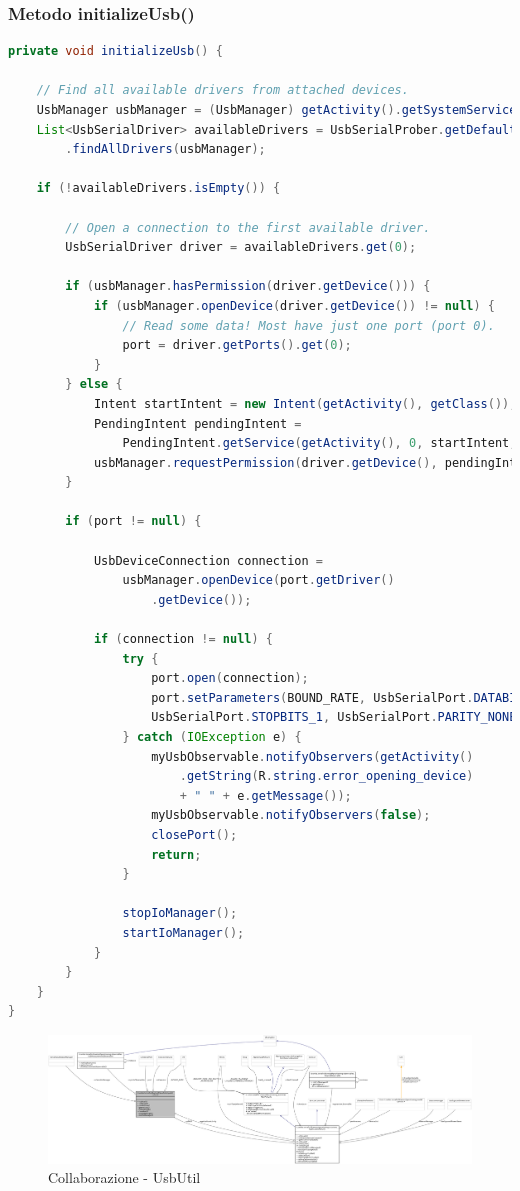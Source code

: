 \subsubsection{Metodo initializeUsb()}
\begin{lstlisting}[language=Java]
private void initializeUsb() {
	
	// Find all available drivers from attached devices.
	UsbManager usbManager = (UsbManager) getActivity().getSystemService(Context.USB_SERVICE);
	List<UsbSerialDriver> availableDrivers = UsbSerialProber.getDefaultProber()
		.findAllDrivers(usbManager);
		
	if (!availableDrivers.isEmpty()) {
		
		// Open a connection to the first available driver.
		UsbSerialDriver driver = availableDrivers.get(0);
		
		if (usbManager.hasPermission(driver.getDevice())) {
			if (usbManager.openDevice(driver.getDevice()) != null) {
				// Read some data! Most have just one port (port 0).
				port = driver.getPorts().get(0);
			}
		} else {
			Intent startIntent = new Intent(getActivity(), getClass());
			PendingIntent pendingIntent =
				PendingIntent.getService(getActivity(), 0, startIntent, 0);
			usbManager.requestPermission(driver.getDevice(), pendingIntent);
		}
		
		if (port != null) {
			
			UsbDeviceConnection connection = 
				usbManager.openDevice(port.getDriver()
					.getDevice());
			
			if (connection != null) {
				try {
					port.open(connection);
					port.setParameters(BOUND_RATE, UsbSerialPort.DATABITS_8,
					UsbSerialPort.STOPBITS_1, UsbSerialPort.PARITY_NONE);
				} catch (IOException e) {
					myUsbObservable.notifyObservers(getActivity()
						.getString(R.string.error_opening_device)
						+ " " + e.getMessage());
					myUsbObservable.notifyObservers(false);
					closePort();
					return;
				}
				
				stopIoManager();
				startIoManager();
			}
		}
	}
}
\end{lstlisting}

\begin{figure}[ph]
	\centering
	\includegraphics[width=1.5\linewidth,angle=90]{img/uml/class/classit_1_1unibo_1_1torsello_1_1bluetoothpositioning_1_1util_1_1UsbUtil__coll__graph.png}
	\caption{Collaborazione - UsbUtil}
\end{figure}

